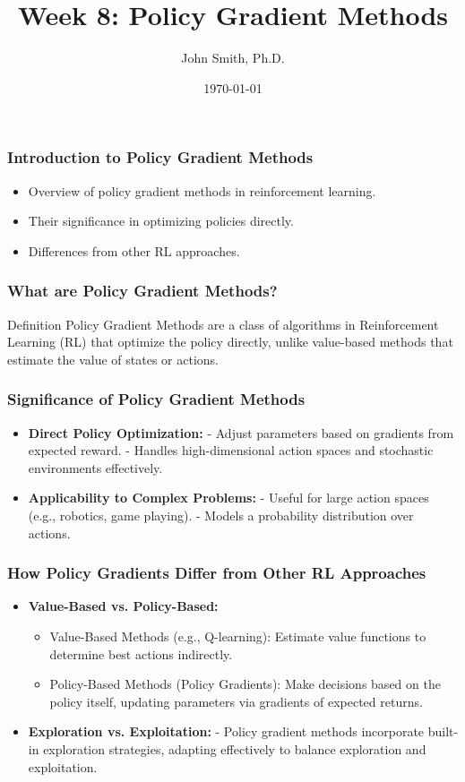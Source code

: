 \documentclass[aspectratio=169]{beamer}
\title[Policy Gradient Methods]{Week 8: Policy Gradient Methods}
\author[J. Smith]{John Smith, Ph.D.}
\institute[University Name]{
  Department of Computer Science\\
  University Name\\
  \vspace{0.3cm}
  Email: email@university.edu\\
  Website: www.university.edu
}
\date{\today}
\begin{document}
\frame{\titlepage}

\begin{frame}[fragile]
    \frametitle{Introduction to Policy Gradient Methods}
    \begin{itemize}
        \item Overview of policy gradient methods in reinforcement learning.
        \item Their significance in optimizing policies directly.
        \item Differences from other RL approaches.
    \end{itemize}
\end{frame}

\begin{frame}[fragile]
    \frametitle{What are Policy Gradient Methods?}
    \begin{block}{Definition}
        Policy Gradient Methods are a class of algorithms in Reinforcement Learning (RL) that optimize the policy directly, unlike value-based methods that estimate the value of states or actions.
    \end{block}
\end{frame}

\begin{frame}[fragile]
    \frametitle{Significance of Policy Gradient Methods}
    \begin{itemize}
        \item \textbf{Direct Policy Optimization:} 
              - Adjust parameters based on gradients from expected reward.
              - Handles high-dimensional action spaces and stochastic environments effectively.
        \item \textbf{Applicability to Complex Problems:} 
              - Useful for large action spaces (e.g., robotics, game playing).
              - Models a probability distribution over actions.
    \end{itemize}
\end{frame}

\begin{frame}[fragile]
    \frametitle{How Policy Gradients Differ from Other RL Approaches}
    \begin{itemize}
        \item \textbf{Value-Based vs. Policy-Based:}
        \begin{itemize}
            \item Value-Based Methods (e.g., Q-learning): Estimate value functions to determine best actions indirectly.
            \item Policy-Based Methods (Policy Gradients): Make decisions based on the policy itself, updating parameters via gradients of expected returns.
        \end{itemize}
        \item \textbf{Exploration vs. Exploitation:} 
              - Policy gradient methods incorporate built-in exploration strategies, adapting effectively to balance exploration and exploitation.
    \end{itemize}
\end{frame}
\end{document}
